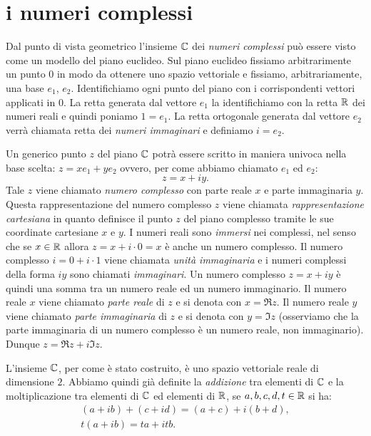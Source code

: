 \section{i numeri complessi}

Dal punto di vista geometrico l'insieme $\CC$ dei \emph{numeri complessi}%
%
\index{$\CC$}
può essere visto come un modello del piano euclideo.
Sul piano euclideo fissiamo arbitrarimente un punto $0$ in modo da ottenere uno spazio
vettoriale e fissiamo, arbitrariamente, una base $e_1$, $e_2$.
Identifichiamo ogni punto del piano con i corrispondenti vettori
applicati in $0$. La retta generata dal vettore $e_1$ la identifichiamo
con la retta ${\mathbb R}$ dei numeri reali e quindi poniamo $1=e_1$.
La retta ortogonale generata dal vettore $e_2$ verrà chiamata
retta dei \emph{numeri immaginari} e definiamo $i=e_2$.

Un generico punto $z$ del piano $\CC$ potrà essere scritto in
maniera univoca nella base scelta: $z = x e_1 + y e_2$ ovvero,
per come abbiamo chiamato $e_1$ ed $e_2$:
\[
z = x + i y.
\]
Tale $z$ viene chiamato
\emph{numero complesso} con parte reale $x$ e parte immaginaria $y$.
Questa rappresentazione del numero complesso $z$ viene
chiamata \emph{rappresentazione cartesiana}%
%
 in quanto definisce
il punto $z$ del piano complesso tramite le sue coordinate cartesiane
$x$ e $y$.
I numeri reali sono \emph{immersi} nei complessi, nel senso che se
$x\in {\mathbb R}$ allora $z= x + i\cdot 0 = x$ è anche un numero complesso.
Il numero complesso $i = 0 + i\cdot 1$ viene chiamata \emph{unità immaginaria}%
%
e i numeri complessi della forma $iy$ sono chiamati \emph{immaginari}.
Un numero
complesso $z = x+iy$ è quindi una somma tra un numero reale ed un numero
immaginario. Il numero reale $x$ viene chiamato \emph{parte reale}
di $z$ e
si denota con $x=\Re z$.
%
Il numero reale $y$ viene chiamato
\emph{parte immaginaria}
di $z$ e si denota con $y=\Im z$
%
(osserviamo che la parte immaginaria di un numero complesso è un numero
reale, non immaginario). Dunque $z= \Re z + i \Im z$.

L'insieme $\CC$, per come
è stato costruito, è uno spazio vettoriale reale di dimensione $2$.
Abbiamo quindi già definite la \emph{addizione}%
%
tra elementi di $\CC$ e la moltiplicazione
tra elementi di $\CC$ ed elementi di ${\mathbb R}$,
se $a,b,c,d,t\in {\mathbb R}$ si ha:
\begin{gather*}
 (a+ib) + (c+id) = (a+c) + i (b+d), \\
 t(a+ib) = ta + itb.
\end{gather*}

